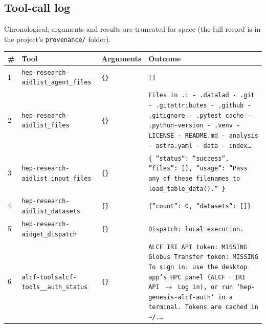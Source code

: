 \documentclass[11pt,a4paper]{article}
\begin{document}
\subsection{Tool-call log}
Chronological; arguments and results are truncated for space (the full record is in the project's \texttt{provenance/} folder).
\begin{longtable}{@{}p{}p{}p{}p{}@{}}
\toprule \# & Tool & Arguments & Outcome \\ \midrule \endhead
1 & \texttt{hep-research-aid}\newline\texttt{list\_\allowbreak{}agent\_\allowbreak{}files} & \texttt{\{\}\allowbreak{}} & \texttt{[]\allowbreak{}} \\
2 & \texttt{hep-research-aid}\newline\texttt{list\_\allowbreak{}files} & \texttt{\{\}\allowbreak{}} & \texttt{Files in .:\allowbreak{}   - .datalad   - .git   - .gitattributes   - .github   - .gitignore   - .pytest\_\allowbreak{}cache   - .python-version   - .venv   - LICENSE   - README.md   - analysis   - astra.yaml   - data   - index\ldots{}\allowbreak{}} \\
3 & \texttt{hep-research-aid}\newline\texttt{list\_\allowbreak{}input\_\allowbreak{}files} & \texttt{\{\}\allowbreak{}} & \texttt{\{   ''status'':\allowbreak{} ''success'',\allowbreak{}   ''files'':\allowbreak{} []\allowbreak{},\allowbreak{}   ''usage'':\allowbreak{} ''Pass any of these filenames to load\_\allowbreak{}table\_\allowbreak{}data()\allowbreak{}.'' \}\allowbreak{}} \\
4 & \texttt{hep-research-aid}\newline\texttt{list\_\allowbreak{}datasets} & \texttt{\{\}\allowbreak{}} & \texttt{\{''count'':\allowbreak{} 0,\allowbreak{} ''datasets'':\allowbreak{} []\allowbreak{}\}\allowbreak{}} \\
5 & \texttt{hep-research-aid}\newline\texttt{get\_\allowbreak{}dispatch} & \texttt{\{\}\allowbreak{}} & \texttt{Dispatch:\allowbreak{} local execution.} \\
6 & \texttt{alcf-tools}\newline\texttt{alcf-tools\_\allowbreak{}\_\allowbreak{}auth\_\allowbreak{}status} & \texttt{\{\}\allowbreak{}} & \texttt{ALCF IRI API token:\allowbreak{} MISSING Globus Transfer token:\allowbreak{} MISSING To sign in:\allowbreak{} use the desktop app's HPC panel (ALCF $\cdot$ IRI API $\to$ Log in)\allowbreak{},\allowbreak{} or run `hep-genesis-alcf-auth` in a terminal. Tokens are cached in \textasciitilde{}\allowbreak{}/\allowbreak{}.\ldots{}\allowbreak{}} \\

\end{longtable}
\end{document}
